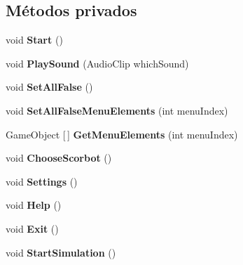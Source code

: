\subsection*{Métodos privados}
\begin{DoxyCompactItemize}
\item 
\mbox{\label{class_animator_functions_a7e15dae380d6f1416d77dc66c300f099}} 
void {\bfseries Start} ()
\item 
\mbox{\label{class_animator_functions_a017b59718f93c1f614590b09139eaacf}} 
void {\bfseries Play\+Sound} (Audio\+Clip which\+Sound)
\item 
\mbox{\label{class_animator_functions_af7c7dc9d64e9329f99a8bef72db57db4}} 
void {\bfseries Set\+All\+False} ()
\item 
\mbox{\label{class_animator_functions_aa757bf3b9943de9bac1a5951b5bd151c}} 
void {\bfseries Set\+All\+False\+Menu\+Elements} (int menu\+Index)
\item 
\mbox{\label{class_animator_functions_af53ea51e66124e05ea5f82080d8e2b6c}} 
Game\+Object \mbox{[}$\,$\mbox{]} {\bfseries Get\+Menu\+Elements} (int menu\+Index)
\item 
\mbox{\label{class_animator_functions_a573963407750082c2ba22b276bc83cdb}} 
void {\bfseries Choose\+Scorbot} ()
\item 
\mbox{\label{class_animator_functions_ab3731a6646ff8ba1174de3e910e0ae0c}} 
void {\bfseries Settings} ()
\item 
\mbox{\label{class_animator_functions_a7cb183fbd7ac3ebb33ae33d67453830b}} 
void {\bfseries Help} ()
\item 
\mbox{\label{class_animator_functions_abbc94844d64966a7d1ad2d3e7cdde3c8}} 
void {\bfseries Exit} ()
\item 
\mbox{\label{class_animator_functions_a22bbcad1e4c262029e07b4203f0f466a}} 
void {\bfseries Start\+Simulation} ()

\end{DoxyCompactItemize}
